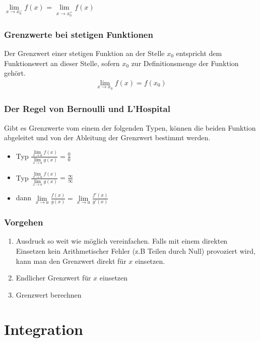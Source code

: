 $\lim\limits_{x \rightarrow x_0^- }f(x)$ = $\lim\limits_{x \rightarrow x_0^+ }f(x)$


\subsubsection{Grenzwerte bei stetigen Funktionen}
Der Grenzwert einer stetigen Funktion an der Stelle $x_0$ entspricht dem Funktionswert an dieser Stelle, sofern $x_0$ zur Definitionsmenge der Funktion gehört.
\begin{align*}
\lim\limits_{x \rightarrow x_0} f(x) = f(x_0)
\end{align*}

\subsubsection{Der Regel von Bernoulli und L'Hospital}
Gibt es Grenzwerte vom einem der folgenden Typen, können die beiden Funktion abgeleitet und von der Ableitung der Grenzwert bestimmt werden.
\begin{itemize}
	\item Typ $ \frac{\lim\limits_{x \rightarrow a}{f(x)}}{\lim\limits_{x \rightarrow a}{g(x)}} =  \frac{0}{0}$
	\item Typ $\frac{\lim\limits_{x \rightarrow a}{f(x)}}{\lim\limits_{x \rightarrow a}{g(x)}} = \frac{\infty}{\infty}$
	\item dann $\lim\limits_{x \rightarrow a}{\frac{f(x)}{g(x)}} = \lim\limits_{x \rightarrow a}{\frac{f'(x)}{g'(x)}}$
\end{itemize}


\subsubsection{Vorgehen}
\begin{enumerate}
\item Ausdruck so weit wie möglich vereinfachen. Falls mit einem direkten Einsetzen kein Arithmetischer Fehler (z.B Teilen durch Null) provoziert wird, kann man den Grenzwert direkt für $x$ einsetzen.
\item Endlicher Grenzwert für $x$ einsetzen
\item Grenzwert berechnen	
\end{enumerate}



\section{Integration}

